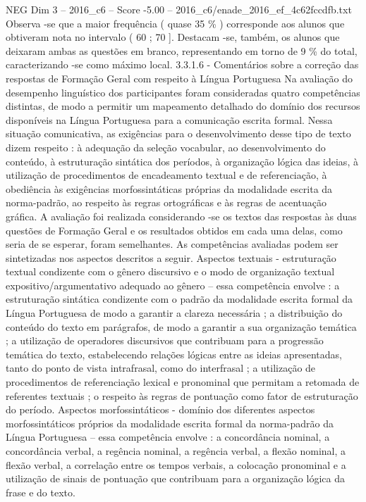 \begin{textsample}{NEG Dim 3 – 2016\_c6 – Score -5.00 – 2016\_c6/enade\_2016\_ef\_4c62fccdfb.txt}
Observa -se que a maior frequência ( quase 35 \% ) corresponde aos alunos que obtiveram nota no intervalo ( 60 ; 70 ].
Destacam -se, também, os alunos que deixaram ambas as questões em branco, representando em torno de 9 \% do total, caracterizando -se como máximo local. 3.3.1.6 - Comentários sobre a correção das respostas de Formação Geral com respeito à Língua Portuguesa Na avaliação do desempenho linguístico dos participantes foram consideradas quatro competências distintas, de modo a permitir um mapeamento detalhado do domínio dos recursos disponíveis na Língua Portuguesa para a comunicação escrita formal.
Nessa situação comunicativa, as exigências para o desenvolvimento desse tipo de texto dizem respeito : à adequação da seleção vocabular, ao desenvolvimento do conteúdo, à estruturação sintática dos períodos, à organização lógica das ideias, à utilização de procedimentos de encadeamento textual e de referenciação, à obediência às exigências morfossintáticas próprias da modalidade escrita da norma-padrão, ao respeito às regras ortográficas e às regras de acentuação gráfica.
A avaliação foi realizada considerando -se os textos das respostas às duas questões de Formação Geral e os resultados obtidos em cada uma delas, como seria de se esperar, foram semelhantes.
As competências avaliadas podem ser sintetizadas nos aspectos descritos a seguir.
Aspectos textuais - estruturação textual condizente com o gênero discursivo e o modo de organização textual expositivo/argumentativo adequado ao gênero – essa competência envolve : a estruturação sintática condizente com o padrão da modalidade escrita formal da Língua Portuguesa de modo a garantir a clareza necessária ; a distribuição do conteúdo do texto em parágrafos, de modo a garantir a sua organização temática ; a utilização de operadores discursivos que contribuam para a progressão temática do texto, estabelecendo relações lógicas entre as ideias apresentadas, tanto do ponto de vista intrafrasal, como do interfrasal ; a utilização de procedimentos de referenciação lexical e pronominal que permitam a retomada de referentes textuais ; o respeito às regras de pontuação como fator de estruturação do período.
Aspectos morfossintáticos - domínio dos diferentes aspectos morfossintáticos próprios da modalidade escrita formal da norma-padrão da Língua Portuguesa – essa competência envolve : a concordância nominal, a concordância verbal, a regência nominal, a regência verbal, a flexão nominal, a flexão verbal, a correlação entre os tempos verbais, a colocação pronominal e a utilização de sinais de pontuação que contribuam para a organização lógica da frase e do texto.

\end{textsample}
